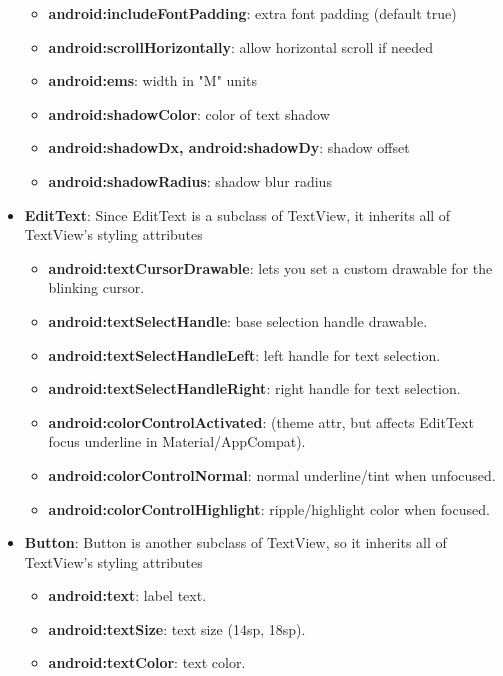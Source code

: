 \documentclass{report}
\begin{document}
\begin{itemize}
\begin{itemize}
                \item \textbf{android:includeFontPadding}: extra font padding (default true)
                \item \textbf{android:scrollHorizontally}: allow horizontal scroll if needed
                \item \textbf{android:ems}: width in "M" units
                \item \textbf{android:shadowColor}: color of text shadow
                \item \textbf{android:shadowDx, android:shadowDy}: shadow offset
                \item \textbf{android:shadowRadius}: shadow blur radius
            \end{itemize}
        \item \textbf{EditText}: Since EditText is a subclass of TextView, it inherits all of TextView's styling attributes
            \begin{itemize}
                \item \textbf{android:textCursorDrawable}: lets you set a custom drawable for the blinking cursor.
                \item \textbf{android:textSelectHandle}: base selection handle drawable.
                \item \textbf{android:textSelectHandleLeft}: left handle for text selection.
                \item \textbf{android:textSelectHandleRight}: right handle for text selection.
                \item \textbf{android:colorControlActivated}: (theme attr, but affects EditText focus underline in Material/AppCompat).
                \item \textbf{android:colorControlNormal}: normal underline/tint when unfocused.
                \item \textbf{android:colorControlHighlight}: ripple/highlight color when focused.
            \end{itemize}
        \item \textbf{Button}: Button is another subclass of TextView, so it inherits all of TextView’s styling attributes
            \begin{itemize}
                \item \textbf{android:text}: label text.
                \item \textbf{android:textSize}: text size (14sp, 18sp).
                \item \textbf{android:textColor}: text color.

\end{itemize}
\end{itemize}
\end{document}

